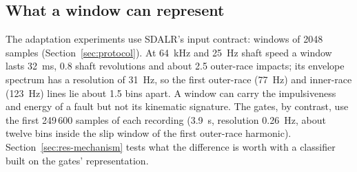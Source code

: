 \subsection{What a window can represent}
\label{sec:windows}

The adaptation experiments use SDALR's input contract: windows of 2048 samples (Section~\ref{sec:protocol}). At
\SI{64}{kHz} and \SI{25}{Hz} shaft speed a window lasts \SI{32}{ms}, 0.8 shaft revolutions and about 2.5 outer-race
impacts; its envelope spectrum has a resolution of \SI{31}{Hz}, so the first outer-race (\SI{77}{Hz}) and inner-race
(\SI{123}{Hz}) lines lie about 1.5 bins apart. A window can carry the impulsiveness and energy of a fault but not its
kinematic signature. The gates, by contrast, use the first 249\,600 samples of each recording (\SI{3.9}{s}, resolution
\SI{0.26}{Hz}, about twelve bins inside the slip window of the first outer-race harmonic). Section~\ref{sec:res-mechanism}
tests what the difference is worth with a classifier built on the gates' representation.
